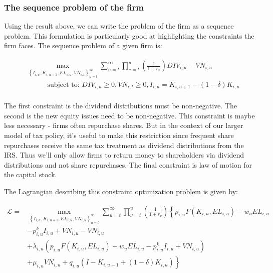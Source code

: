 \documentclass[letterpaper,12pt]{article}
\theoremstyle{definition}
\begin{document}
\begin{spacing}{1.5}
\subsubsection*{The sequence problem of the firm}

Using the result above, we can write the problem of the firm as a sequence problem.  This formulation is particularly good at highlighting the constraints the firm faces.  The sequence problem of a given firm is:

\begin{equation}
\label{eqn:firm_seq_prob}
\begin{split}
&\max_{\left\{I_{i,u}, K_{i,u+1},EL_{i,u},VN_{i,t}\right\}_{u=t}^{\infty}} \sum_{u=t}^{\infty} \prod_{\nu=t}^{u} \left(\frac{1}{1+r_{v}}\right) DIV_{i,u}-VN_{i,u} \\
&\quad\quad\quad \text{subject to: } DIV_{i,u}\geq0, VN_{i,t}\geq0, I_{i,u} = K_{i,u+1}-(1-\delta)K_{i,u} \\
\end{split}
\end{equation}

The first constraint is the dividend distributions must be non-negative.  The second is the new equity issues need to be non-negative.  This constraint is maybe less necessary - firms often repurchase shares.  But in the context of our larger model of tax policy, it's useful to make this restriction since frequent share repurchases receive the same tax treatment as dividend distributions from the IRS.  Thus we'll only allow firms to return money to shareholders via dividend distributions and not share repurchases.   The final constraint is law of motion for the capital stock.

The Lagrangian describing this constraint optimization problem is given by:

\begin{equation}
\label{eqn:firm_lagrange}
\begin{split}
\mathcal{L} = &  \max_{\left\{I_{i,u},K_{i,u+1},EL_{i,u},VN_{i,u}\right\}_{u=t}^{\infty}} \sum_{u=t}^{\infty} \prod_{\nu=t}^{u} \left(\frac{1}{1+r_{v}}\right) \left\{ p_{i,u}F(K_{i,u},EL_{i,u}) - w_{u}EL_{i,u} \right.\\
       & \left. -p^{k}_{i,u}I_{i,u} +VN_{i,u} - VN_{i,u} \right. \\
       &+\left. \lambda_{i,u}(p_{i,u}F(K_{i,u},EL_{i,u}) - w_{u}EL_{i,u} -p^{k}_{i,u}I_{i,u} +VN_{i,u}) \right. \\
       &+ \left. \mu_{i,u}VN_{i,u} + q_{i,u}(I - K_{i,u+1} + (1-\delta)K_{i,u})\right\} \\
\end{split}
\end{equation}


\end{spacing}
\end{document}
